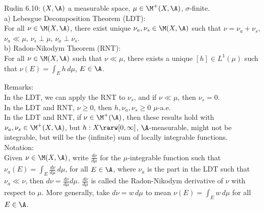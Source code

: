 

\break

Rudin 6.10: $(X, \A)$ a measurable space, $\mu \in \M^+(X, \A)$, $\sigma$-finite. \\

\noindent 
a) Lebesgue Decomposition Theorem (LDT): \\

\noindent 
For all $\nu \in \M(X, \A)$, there exist unique $\nu_a, \nu_s \in \M(X, \A)$ such that $\nu = \nu_a + \nu_s$, $\nu_a \ll \mu$, $\nu_s \perp \mu$, $\nu_a \perp \nu_s$. \\

\noindent 
b) Radon-Nikodym Theorem (RNT): \\

\noindent 
For all $\nu \in \M(X, \A)$ such that $\nu \ll \mu$, there exists a unique $[h] \in L^1(\mu)$ such that $ \nu(E) = \int_E h \, d\mu $, $E \in \A$. \\

\vspace{10pt}

\noindent
Remarks:  \\

\noindent
In the LDT, we can apply the RNT to $\nu_s$, and if $\nu \ll \mu$, then $\nu_s = 0$. \\

\noindent
In the LDT and RNT, $\nu \ge 0$, then $h, \nu_a, \nu_s \ge 0$ $\mu$-a.e. \\

\noindent
In the LDT and RNT, if $\nu \in \M^+(\A)$, then these results hold with $\nu_a, \nu_s \in \M^+(X, \A)$, but  $h: X \rarw [0, \infty]$, $\A$-measurable, might not be integrable, but will be the (infinite) sum of locally integrable functions. \\

\noindent
Notation: \\


\noindent
Given $\nu \in \M(X, \A)$, write $\frac{d\nu}{d\mu}$ for the $\mu$-integrable function such that $\nu_a(E) = \int_E \frac{d\nu}{d\mu} \, d\mu$, for all $E \in \A$, where $\nu_a$ is the part in the LDT such that $\nu_a \ll \nu$, then $d\nu =\frac{d\nu}{d\mu} d\mu$. $\frac{d\nu}{d\mu}$ is called the Radon-Nikodym derivative of $\nu$ with respect to $\mu$. More generally, take $d\nu = w \, d\mu$ to mean $\nu(E) = \int_E w \, d\mu$ for all $E \in \A$. \\




